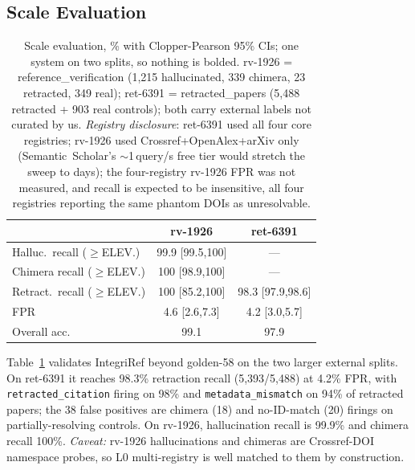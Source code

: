\documentclass[runningheads]{llncs}
\begin{document}
\subsection{Scale Evaluation}

\begin{table}[!tb]
\centering
\small
\setlength{\tabcolsep}{4pt}
\begin{tabular}{@{}lcc@{}}
\toprule
& \textbf{rv-1926} & \textbf{ret-6391} \\
\midrule
Halluc.\ recall ($\geq$ELEV.)  & 99.9 \footnotesize{[99.5,100]}  & --- \\
Chimera recall ($\geq$ELEV.)   & 100  \footnotesize{[98.9,100]}  & --- \\
Retract.\ recall ($\geq$ELEV.) & 100  \footnotesize{[85.2,100]}  & 98.3 \footnotesize{[97.9,98.6]} \\
FPR                            & 4.6 \footnotesize{[2.6,7.3]}    & 4.2 \footnotesize{[3.0,5.7]} \\
Overall acc.                   & 99.1                            & 97.9 \\
\bottomrule
\end{tabular}
\caption{Scale evaluation, \% with Clopper-Pearson 95\% CIs; one system on two splits, so nothing is bolded. rv-1926 = reference\_verification (1{,}215 hallucinated, 339 chimera, 23 retracted, 349 real); ret-6391 = retracted\_papers (5{,}488 retracted + 903 real controls); both carry external labels not curated by us. \emph{Registry disclosure}: ret-6391 used all four core registries; rv-1926 used Crossref+OpenAlex+arXiv only (Semantic~Scholar's $\sim$1\,query/s free tier would stretch the sweep to days); the four-registry rv-1926 FPR was not measured, and recall is expected to be insensitive, all four registries reporting the same phantom DOIs as unresolvable.}
\label{tab:scale}
\end{table}

Table~\ref{tab:scale} validates IntegriRef beyond golden-58 on the two larger external splits. On ret-6391 it reaches 98.3\% retraction recall (5{,}393/5{,}488) at 4.2\% FPR, with \texttt{retracted\_citation} firing on 98\% and \texttt{metadata\_mismatch} on 94\% of retracted papers; the 38 false positives are chimera (18) and no-ID-match (20) firings on partially-resolving controls. On rv-1926, hallucination recall is 99.9\% and chimera recall 100\%. \emph{Caveat:} rv-1926 hallucinations and chimeras are Crossref-DOI namespace probes, so L0 multi-registry is well matched to them by construction.
\end{document}
